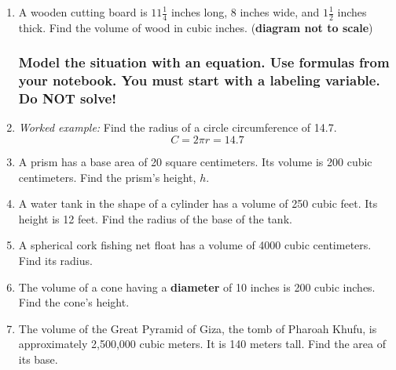 \begin{enumerate}
  \item  A wooden cutting board is $11 \frac{1}{4}$ inches long, 8 inches wide, and $1 \frac{1}{2}$ inches thick. Find the volume of wood in cubic inches. \hfill (\textbf{diagram not to scale})
    \begin{flushright}
      \end{flushright} \vspace{2cm}

\newpage
\subsubsection*{Model the situation with an equation. Use formulas from your notebook. You must start with a labeling variable. \hfill Do NOT solve!}

\item \emph{Worked example:} Find the radius of a circle circumference of 14.7.
\[C=2\pi r=14.7\]

\item A prism has a base area of 20 square centimeters. Its volume is 200 cubic centimeters. Find the prism's height, $h$. \vspace{2cm}

\item A water tank in the shape of a cylinder has a volume of 250 cubic feet. Its height is 12 feet. Find the radius of the base of the tank. \vspace{2cm}

\item A spherical cork fishing net float has a volume of 4000 cubic centimeters. Find its radius. \vspace{2cm}

\item The volume of a cone having a \textbf{diameter} of 10 inches is 200 cubic inches. Find the cone's height. \vspace{2cm}

\item The volume of the Great Pyramid of Giza, the tomb of Pharoah Khufu, is approximately 2,500,000 cubic meters. It is 140 meters tall. Find the area of its base.  \vspace{2cm}


\end{enumerate}
